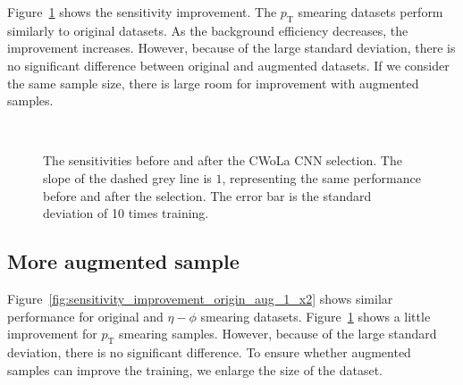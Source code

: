 \documentclass[12pt]{article}
\begin{document}
		Figure~\ref{fig:sensitivity_improvement_origin_pt_aug_1} shows the sensitivity improvement. The $p_{\text{T}}$ smearing datasets perform similarly to original datasets. As the background efficiency decreases, the improvement increases. However, because of the large standard deviation, there is no significant difference between original and augmented datasets. If we consider the same sample size, there is large room for improvement with augmented samples.
		\begin{figure}[htpb]
			\centering
			 \\
			\caption{The sensitivities before and after the CWoLa CNN selection. The slope of the dashed grey line is $1$, representing the same performance before and after the selection. The error bar is the standard deviation of 10 times training.}
			\label{fig:sensitivity_improvement_origin_pt_aug_1}
		\end{figure}
	\subsection{More augmented sample}%
	\label{sub:more_augmented_sample}
		Figure~\ref{fig:sensitivity_improvement_origin_aug_1_x2} shows similar performance for original and $\eta-\phi$ smearing datasets. Figure~\ref{fig:sensitivity_improvement_origin_pt_aug_1} shows a little improvement for $p_{\text{T}}$ smearing samples. However, because of the large standard deviation, there is no significant difference. To ensure whether augmented samples can improve the training, we enlarge the size of the dataset.
\end{document}

